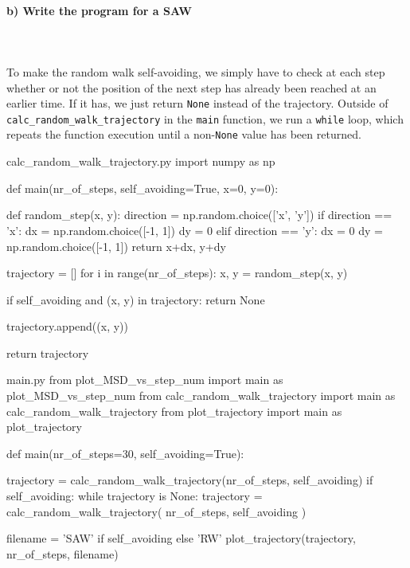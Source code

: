 \paragraph{b) Write the program for a SAW} \ \\
\\
    To make the random walk self-avoiding, we simply have to check 
    at each step whether or not the position of the next step has 
    already been reached at an earlier time. If it has, we just return 
    \lstinline{None} instead of the trajectory. Outside of
    \lstinline{calc_random_walk_trajectory} in the 
    \lstinline{main} function, we run a 
    \lstinline{while} loop, which repeats the function execution until a 
    non-\lstinline{None} value has been returned.
    \begin{code}{calc\_random\_walk\_trajectory.py}
        import numpy as np
        
        
        def main(nr_of_steps, self_avoiding=True, x=0, y=0):
        
            def random_step(x, y):
                direction = np.random.choice(['x', 'y'])
                if direction == 'x':
                    dx = np.random.choice([-1, 1])
                    dy = 0
                elif direction == 'y':
                    dx = 0
                    dy = np.random.choice([-1, 1])
                return x+dx, y+dy

            trajectory = []
            for i in range(nr_of_steps):
                x, y = random_step(x, y)
        
                if self_avoiding and (x, y) in trajectory:
                    return None
        
                trajectory.append((x, y))
        
            return trajectory\end{code}

    \begin{code}{main.py}
        from plot_MSD_vs_step_num import main as plot_MSD_vs_step_num
        from calc_random_walk_trajectory import main as calc_random_walk_trajectory
        from plot_trajectory import main as plot_trajectory
        
        
        def main(nr_of_steps=30, self_avoiding=True):
        
            trajectory = calc_random_walk_trajectory(nr_of_steps, self_avoiding)
            if self_avoiding:
                while trajectory is None:
                    trajectory = calc_random_walk_trajectory(
                        nr_of_steps, self_avoiding
                    )
        
            filename = 'SAW' if self_avoiding else 'RW'
            plot_trajectory(trajectory, nr_of_steps, filename)\end{code}

